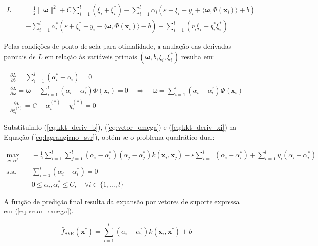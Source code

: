 \begin{align}
    L = & \quad \frac{1}{2}\|\boldsymbol{\omega}\|^2 + C\sum_{i=1}^{l}(\xi_i + \xi_i^*) - \sum_{i=1}^{l}\alpha_i(\varepsilon + \xi_i - y_i + \langle \boldsymbol{\omega}, \Phi(\mathbf{x}_i) \rangle + b) \nonumber \\
    & - \sum_{i=1}^{l}\alpha_i^*(\varepsilon + \xi_i^* + y_i - \langle \boldsymbol{\omega}, \Phi(\mathbf{x}_i) \rangle - b) - \sum_{i=1}^{l}(\eta_i\xi_i + \eta_i^*\xi_i^*) \label{eq:lagrangiano_svr}
\end{align}

Pelas condições de ponto de sela para otimalidade, a anulação das derivadas parciais de $L$ em relação às variáveis primais $(\boldsymbol{\omega}, b, \xi_i, \xi_i^*)$ resulta em:

\begin{align}
    \frac{\partial L}{\partial b} = \sum_{i=1}^{l}(\alpha_i^* - \alpha_i) = 0 \label{eq:kkt_deriv_b} \\
    \frac{\partial L}{\partial \boldsymbol{\omega}} = \boldsymbol{\omega} - \sum_{i=1}^{l}(\alpha_i - \alpha_i^*)\Phi(\mathbf{x}_i) = 0 \quad \Longrightarrow \quad \boldsymbol{\omega} = \sum_{i=1}^{l}(\alpha_i - \alpha_i^*)\Phi(\mathbf{x}_i) \label{eq:vetor_omega} \\
    \frac{\partial L}{\partial \xi_i^{(*)}} = C - \alpha_i^{(*)} - \eta_i^{(*)} = 0 \label{eq:kkt_deriv_xi}
\end{align}

Substituindo (\ref{eq:kkt_deriv_b}), (\ref{eq:vetor_omega}) e (\ref{eq:kkt_deriv_xi}) na Equação (\ref{eq:lagrangiano_svr}), obtém-se o problema quadrático dual:

\begin{align}
    \max_{\boldsymbol{\alpha}, \boldsymbol{\alpha}^*} & \quad -\frac{1}{2}\sum_{i=1}^{l}\sum_{j=1}^{l}(\alpha_i - \alpha_i^*)(\alpha_j - \alpha_j^*) k(\mathbf{x}_i, \mathbf{x}_j) - \varepsilon\sum_{i=1}^{l}(\alpha_i + \alpha_i^*) + \sum_{i=1}^{l}y_i(\alpha_i - \alpha_i^*) \label{eq:dual_svr} \\
    \text{s.a.} & \quad \sum_{i=1}^{l}(\alpha_i - \alpha_i^*) = 0 \label{eq:restr_dual1} \\
    & \quad 0 \le \alpha_i, \alpha_i^* \le C, \quad \forall i \in \{1, \dots, l\} \label{eq:restr_dual2}
\end{align}

A função de predição final resulta da expansão por vetores de suporte expressa em (\ref{eq:vetor_omega}):

\begin{equation}
    \hat{f}_{\text{SVR}}(\mathbf{x}^*) = \sum_{i=1}^{l} (\alpha_i - \alpha_i^*) k(\mathbf{x}_i, \mathbf{x}^*) + b \label{eq:predicao_final_svr}
\end{equation}

